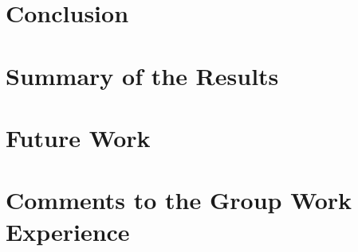 \documentclass[lang=english,inputenc=utf8,fontsize=10pt]{ldvarticle}
\begin{document}
\lipsum[18]

\newpage

\section{Conclusion}

\lipsum[19]

\section*{Summary of the Results}

\lipsum[20]

\section*{Future Work}



\lipsum[21]

\newpage

\section{Comments to the Group Work Experience}

\lipsum[22]
\end{document}

